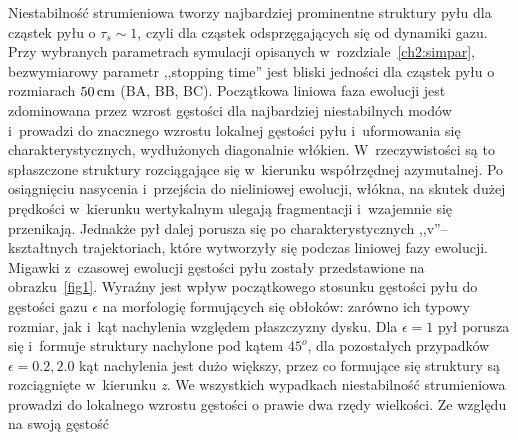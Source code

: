 Niestabilność strumieniowa tworzy najbardziej prominentne struktury pyłu dla
cząstek pyłu o $\tau_s \sim 1$, czyli dla cząstek odsprzęgających się od
dynamiki gazu.
Przy wybranych parametrach symulacji opisanych w~rozdziale~\ref{ch2:simpar},
bezwymiarowy parametr ,,stopping time'' jest bliski jedności dla cząstek pyłu o
rozmiarach $50\hbox{$\thinspace\textrm{cm}$}$ (BA, BB, BC). Początkowa liniowa faza ewolucji jest
zdominowana przez wzrost gęstości dla najbardziej niestabilnych modów i~prowadzi
do znacznego wzrostu lokalnej gęstości pyłu i~uformowania się
charakterystycznych, wydłużonych diagonalnie włókien. W~rzeczywistości są to
spłaszczone struktury rozciągające się w~kierunku współrzędnej azymutalnej. Po
osiągnięciu nasycenia i~przejścia do nieliniowej ewolucji, włókna, na skutek
dużej prędkości w~kierunku wertykalnym ulegają fragmentacji i~wzajemnie się
przenikają. Jednakże pył dalej porusza się po charakterystycznych
,,v''--kształtnych trajektoriach, które wytworzyły się podczas liniowej fazy
ewolucji. Migawki z~czasowej ewolucji gęstości pyłu zostały przedstawione na
obrazku~\ref{fig1}. Wyraźny jest wpływ początkowego stosunku gęstości pyłu do
gęstości gazu $\epsilon$ na morfologię formujących się obłoków: zarówno ich
typowy rozmiar, jak i~kąt nachylenia względem płaszczyzny dysku. Dla $\epsilon =
1$ pył porusza się i~formuje struktury nachylone pod kątem $45^o$, dla
pozostałych przypadków $\epsilon=0.2, 2.0$ kąt nachylenia jest dużo większy,
przez co formujące się struktury są rozciągnięte w~kierunku \emph{z}. We
wszystkich wypadkach niestabilność strumieniowa prowadzi do lokalnego wzrostu
gęstości o prawie dwa rzędy wielkości.  Ze względu na swoją gęstość


